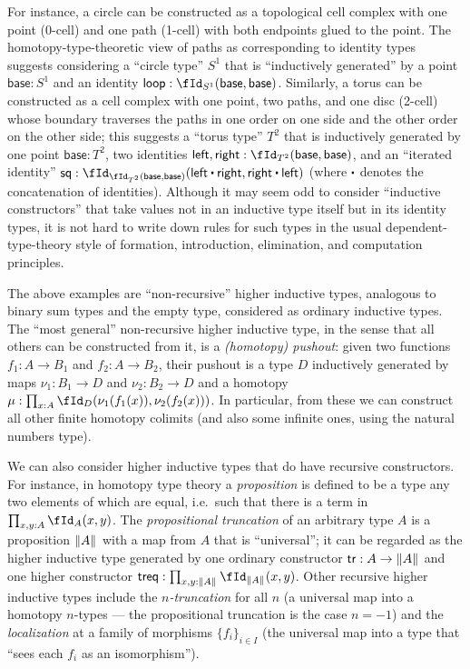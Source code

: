 \documentclass[referee]{psp}
\def\tr{\mathsf{tr}}
\def\treq{\mathsf{treq}}
\begin{document}
For instance, a circle can be constructed as a topological cell complex with one point (0-cell) and one path (1-cell) with both endpoints glued to the point.
The homotopy-type-theoretic view of paths as corresponding to identity types suggests considering a ``circle type'' $S^1$ that is ``inductively generated'' by a point $\mathsf{base}:S^1$ and an identity $\mathsf{loop}: \id[S^1]{\mathsf{base}}{\mathsf{base}}$.
Similarly, a torus can be constructed as a cell complex with one point, two paths, and one disc (2-cell) whose boundary traverses the paths in one order on one side and the other order on the other side; this suggests a ``torus type'' $T^2$ that is inductively generated by one point $\mathsf{base}:T^2$, two identities $\mathsf{left},\mathsf{right}:\id[T^2]{\mathsf{base}}{\mathsf{base}}$, and an ``iterated identity'' $\mathsf{sq} : \id[{\id[T^2]{\mathsf{base}}{\mathsf{base}}}]{\mathsf{left}\ct\mathsf{right}}{\mathsf{right}\ct\mathsf{left}}$ (where $\ct$ denotes the concatenation of identities).
Although it may seem odd to consider ``inductive constructors'' that take values not in an inductive type itself but in its identity types, it is not hard to write down rules for such types in the usual dependent-type-theory style of formation, introduction, elimination, and computation principles.

The above examples are ``non-recursive'' higher inductive types, analogous to binary sum types and the empty type, considered as ordinary inductive types.
The ``most general'' non-recursive higher inductive type, in the sense that all others can be constructed from it, is a \emph{(homotopy) pushout}: given two functions $f_1:A\to B_1$ and $f_2:A\to B_2$, their pushout is a type $D$ inductively generated by maps $\nu_1:B_1\to D$ and $\nu_2:B_2\to D$ and a homotopy $\mu:\prod_{x:A} \id[D]{\nu_1(f_1(x))}{\nu_2(f_2(x))}$.
In particular, from these we can construct all other finite homotopy colimits (and also some infinite ones, using the natural numbers type).

We can also consider higher inductive types that do have recursive constructors.
For instance, in homotopy type theory a \emph{proposition} is defined to be a type any two elements of which are equal, i.e.\ such that there is a term in $\prod_{x,y:A} \id[A]xy$.
The \emph{propositional truncation} of an arbitrary type $A$ is a proposition $\mathopen{}\left\Vert A\right\Vert_{}\mathclose{}$ with a map from $A$ that is ``universal''; it can be regarded as the higher inductive type generated by one ordinary constructor $\tr:A\to\brck{A}$ and one higher constructor $\treq : \prod_{x,y:\brck{A}}\id[\brck{A}]{x}{y}$.
Other recursive higher inductive types include the \emph{$n$-truncation} for all $n$ (a universal map into a homotopy $n$-types --- the propositional truncation is the case $n=-1$) and the \emph{localization} at a family of morphisms $\{f_i\}_{i\in I}$ (the universal map into a type that ``sees each $f_i$ as an isomorphism'').
\end{document}
